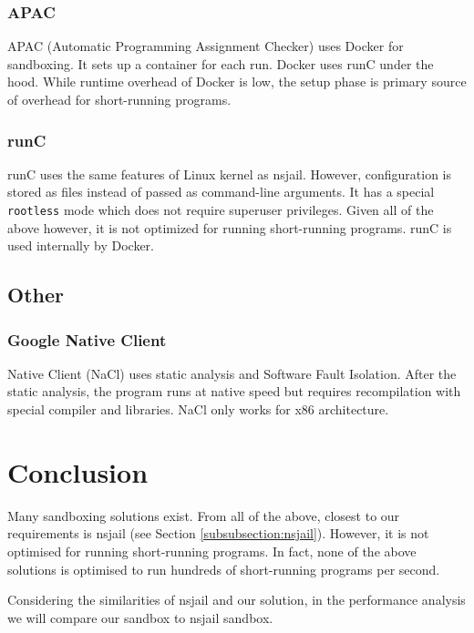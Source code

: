 \documentclass[en]{pracamgr}
\begin{document}
\subsubsection{APAC}
APAC (Automatic Programming Assignment Checker) \cite{SPACEK20151665} uses Docker for sandboxing. It sets up a container for each run. Docker uses runC under the hood. While runtime overhead of Docker is low, the setup phase is primary source of overhead for short-running programs.

\subsubsection{runC}
runC \cite{cochak2021runc} uses the same features of Linux kernel as nsjail. However, configuration is stored as files instead of passed as command-line arguments. It has a special \texttt{rootless} mode which does not require superuser privileges. Given all of the above however, it is not optimized for running short-running programs. runC is used internally by Docker.

\subsection{Other}

\subsubsection{Google Native Client}
Native Client (NaCl) \cite{yee2010native} uses static analysis and Software Fault Isolation. After the static analysis, the program runs at native speed but requires recompilation with special compiler and libraries. NaCl only works for x86 architecture.

\section{Conclusion}

Many sandboxing solutions exist. From all of the above, closest to our requirements is nsjail (see Section \ref{subsubsection:nsjail}). However, it is not optimised for running short-running programs. In fact, none of the above solutions is optimised to run hundreds of short-running programs per second.

Considering the similarities of nsjail and our solution, in the performance analysis we will compare our sandbox to nsjail sandbox.

\end{document}
